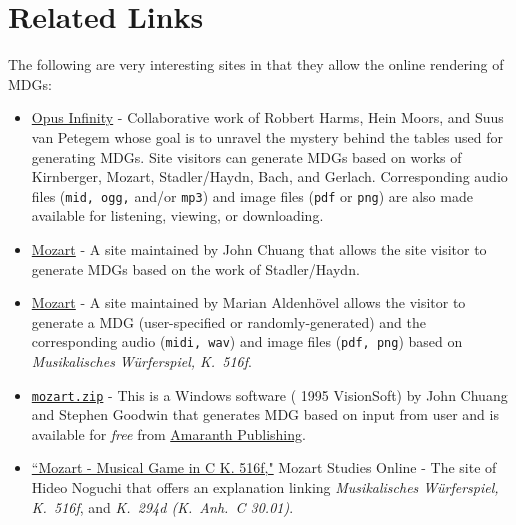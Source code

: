 \documentclass[a4paper,x11names,svgnames,10pt]{article}
\begin{document}
{%
%	


\newpage
\section{Related Links}
The following are very interesting sites in that they allow the online rendering of MDGs:
\begin{itemize}
	\item \href{https://opus-infinity.org}{Opus Infinity} - Collaborative work of Robbert Harms, Hein Moors, and Suus van Petegem whose goal is to unravel the mystery behind the tables used for generating MDGs.  Site visitors can generate MDGs based on works of Kirnberger, Mozart, Stadler/Haydn, Bach, and Gerlach.  Corresponding audio files ({\tt mid, ogg,} and/or {\tt mp3}) and image files ({\tt pdf} or {\tt png}) are also made available for listening, viewing, or downloading.
	
	\item  \href{http://sunsite.univie.ac.at/Mozart/dice/}{Mozart} - A site maintained by John Chuang that allows the site visitor to generate MDGs based on the work of Stadler/Haydn.
	
	\item  \href{https://marian-aldenhoevel.de/mozart/}{Mozart} - A site maintained by Marian Aldenh\"{o}vel allows the visitor to generate a MDG (user-specified or randomly-generated) and the corresponding audio ({\tt midi, wav}) and image files ({\tt pdf, png}) based on {\em Musikalisches W\"{u}rferspiel, K.\ 516f}.
	
	\item \href{https://www.amaranthpublishing.com/mozart.zip}{\tt mozart.zip} -  This is a Windows software ({\small\textcopyright} 1995 VisionSoft) by John Chuang and Stephen Goodwin that generates MDG based on input from user and is available for {\it free} from  \href{http://www.amaranthpublishing.com/MozartDiceGame.htm}{Amaranth Publishing}.  
	
	\item \href{(http://www.asahi-net.or.jp/\~rb5h-ngc/e/k516f.htm}{``Mozart - Musical Game in C K. 516f,"}	Mozart Studies Online - The site of Hideo Noguchi that offers an explanation linking {\em Musikalisches W\"{u}rferspiel, K.\ 516f}, and  {\em K.\ 294d (K.\ Anh.\ C 30.01)}. 
\end{itemize}

}
\end{document}
